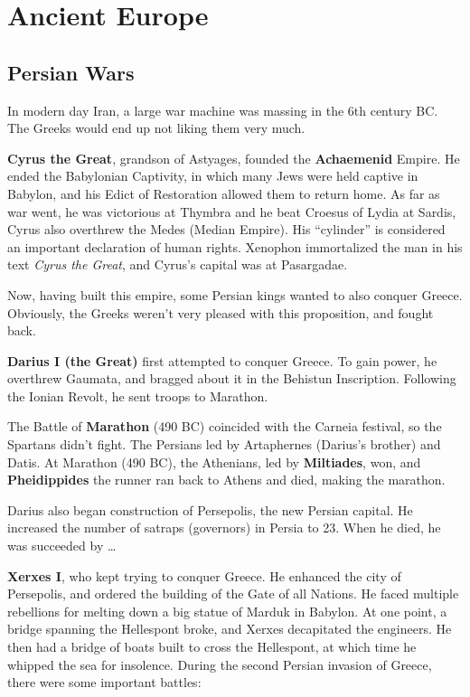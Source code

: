 \chapter{Ancient Europe}

\section{Persian Wars}

In modern day Iran, a large war machine was massing in the 6th century BC\@.
The Greeks would end up not liking them very much.

\textbf{Cyrus the Great}, grandson of Astyages, founded the \textbf{Achaemenid} Empire.
He ended the Babylonian Captivity, in which many Jews were held captive in Babylon,
and his Edict of Restoration allowed them to return home.
As far as war went, he was victorious at Thymbra and he beat Croesus of Lydia at Sardis,
Cyrus also overthrew the Medes (Median Empire).
His ``cylinder'' is considered an important declaration of human rights.
Xenophon immortalized the man in his text \textit{Cyrus the Great}, and Cyrus's capital was at Pasargadae.

Now, having built this empire, some Persian kings wanted to also conquer Greece.
Obviously, the Greeks weren't very pleased with this proposition, and fought back.

\textbf{Darius I (the Great)} first attempted to conquer Greece.
To gain power, he overthrew Gaumata, and bragged about it in the Behistun Inscription.
Following the Ionian Revolt, he sent troops to Marathon.

The Battle of \textbf{Marathon} (490 BC) coincided with the Carneia festival, so the Spartans didn't fight.
The Persians led by Artaphernes (Darius's brother) and Datis.
At Marathon (490 BC), the Athenians, led by \textbf{Miltiades}, won,
and \textbf{Pheidippides} the runner ran back to Athens and died, making the marathon.

Darius also began construction of Persepolis, the new Persian capital.
He increased the number of satraps (governors) in Persia to 23.
When he died, he was succeeded by \ldots

\textbf{Xerxes I}, who kept trying to conquer Greece.
He enhanced the city of Persepolis, and ordered the building of the Gate of all Nations.
He faced multiple rebellions for melting down a big statue of Marduk in Babylon.
At one point, a bridge spanning the Hellespont broke, and Xerxes decapitated the engineers.
He then had a bridge of boats built to cross the Hellespont,
at which time he whipped the sea for insolence.
During the second Persian invasion of Greece, there were some important battles:

